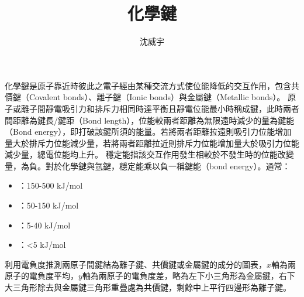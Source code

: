 \documentclass[a4paper,12pt]{report}
\begin{document}
\title{化學鍵}
\author{沈威宇}
\date{\temtoday}
\titletocdoc
{}
化學鍵是原子靠近時彼此之電子經由某種交流方式使位能降低的交互作用，包含共價鍵（Covalent bonds）、離子鍵（Ionic bonds）與金屬鍵（Metallic bonds）。
原子或離子間靜電吸引力和排斥力相同時達平衡且靜電位能最小時稱成鍵，此時兩者間距離為鍵長/鍵距（Bond length），位能較兩者距離為無限遠時減少的量為鍵能（Bond energy），即打破該鍵所須的能量。若將兩者距離拉遠則吸引力位能增加量大於排斥力位能減少量，若將兩者距離拉近則排斥力位能增加量大於吸引力位能減少量，總電位能均上升。
穩定能指該交互作用發生相較於不發生時的位能改變量，為負。對於化學鍵與氫鍵，穩定能乘以負一稱鍵能（bond energy）。通常：
\begin{itemize}
\item {}：150-500 kJ/mol
\item {}：50-150 kJ/mol
\item {}：5-40 kJ/mol
\item {}：<5 kJ/mol
\end{itemize}
利用電負度推測兩原子間鍵結為離子鍵、共價鍵或金屬鍵的成分的圖表，$x$軸為兩原子的電負度平均，$y$軸為兩原子的電負度差，略為左下小三角形為金屬鍵，右下大三角形除去與金屬鍵三角形重疊處為共價鍵，剩餘中上平行四邊形為離子鍵。
\end{document}

